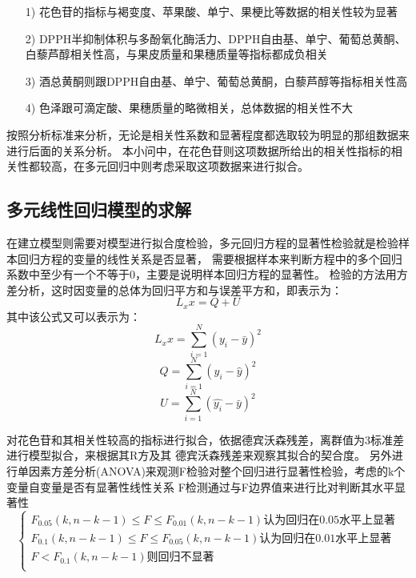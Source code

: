 \documentclass[UTF8]{ctexart}
\begin{document}
					\begin{itemize}
						\item [{1)}]{花色苷的指标与褐变度、苹果酸、单宁、果梗比等数据的相关性较为显著}
						\item [2)]{DPPH半抑制体积与多酚氧化酶活力、DPPH自由基、单宁、葡萄总黄酮、白藜芦醇相关性高，与果皮质量和果穗质量等指标都成负相关}
						\item [3)]{酒总黄酮则跟DPPH自由基、单宁、葡萄总黄酮，白藜芦醇等指标相关性高}
						\item [4)]{色泽跟可滴定酸、果穗质量的略微相关，总体数据的相关性不大}
					\end{itemize}

					按照分析标准来分析，无论是相关性系数和显著程度都选取较为明显的那组数据来进行后面的关系分析。
					本小问中，在花色苷则这项数据所给出的相关性指标的相关性都较高，在多元回归中则考虑采取这项数据来进行拟合。

					\subsection{多元线性回归模型的求解}
					在建立模型则需要对模型进行拟合度检验，多元回归方程的显著性检验就是检验样本回归方程的变量的线性关系是否显著，
					需要根据样本来判断方程中的多个回归系数中至少有一个不等于0，主要是说明样本回归方程的显著性。
					检验的方法用方差分析，这时因变量的总体为回归平方和与误差平方和，即表示为：
						\begin{equation}
							L_xx = Q+U					
						\end{equation}
						其中该公式又可以表示为：
						\begin{equation}
							L_xx=\sum_{i=1}^{N}(y_i-\bar{y})^2
						\end{equation}
						\begin{equation}
							Q=\sum_{i=1}^{N}(y_i-\hat{y})^2
						\end{equation}
						\begin{equation}
							U=\sum_{i=1}^{N}(\hat{y_i}-\bar{y})^2
						\end{equation}
					
						对花色苷和其相关性较高的指标进行拟合，依据德宾沃森残差，离群值为3标准差进行模型拟合，来根据其R方及其
						德宾沃森残差来观察其拟合的契合度。
						另外进行单因素方差分析(ANOVA)来观测F检验对整个回归进行显著性检验，考虑的k个变量自变量是否有显著性线性关系
						F检测通过与F边界值来进行比对判断其水平显著性
						\[\left\{\begin{array}{llcl}
							F_0.05(k,n-k-1) \le F \le F_0.01(k,n-k-1){认为回归在0.05水平上显著} \\

							F_0.1(k,n-k-1) \le F \le F_0.05(k,n-k-1){认为回归在0.01水平上显著} \\

							F<F_0.1(k,n-k-1){则回归不显著} \\
						
					   \end{array} \right.\]
\end{document}
